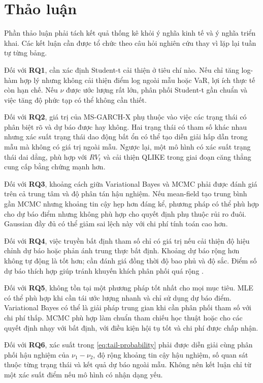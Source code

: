 \documentclass[12pt,a4paper]{article}
\numberwithin{equation}{section}
\newcommand{\RQ}[1]{\textbf{RQ#1}}
\begin{document}
\section{Thảo luận}\label{sec:thao-luan}

Phần thảo luận phải tách kết quả thống kê khỏi ý nghĩa kinh tế và ý nghĩa triển khai. Các kết luận cần được tổ chức theo câu hỏi nghiên cứu thay vì lặp lại tuần tự từng bảng.

Đối với \RQ{1}, cần xác định Student-t cải thiện ở tiêu chí nào. Nếu chỉ tăng log-hàm hợp lý nhưng không cải thiện điểm log ngoài mẫu hoặc VaR, lợi ích thực tế còn hạn chế. Nếu $\nu$ được ước lượng rất lớn, phân phối Student-t gần chuẩn và việc tăng độ phức tạp có thể không cần thiết.

Đối với \RQ{2}, giá trị của MS-GARCH-X phụ thuộc vào việc các trạng thái có phân biệt rõ và dự báo được hay không. Hai trạng thái có tham số khác nhau nhưng xác suất trạng thái dao động bất ổn có thể tạo diễn giải hấp dẫn trong mẫu mà không có giá trị ngoài mẫu. Ngược lại, một mô hình có xác suất trạng thái dai dẳng, phù hợp với $RV_t$ và cải thiện QLIKE trong giai đoạn căng thẳng cung cấp bằng chứng mạnh hơn.

Đối với \RQ{3}, khoảng cách giữa Variational Bayes và MCMC phải được đánh giá trên cả trung tâm và độ phân tán hậu nghiệm. Nếu mean-field tạo trung bình gần MCMC nhưng khoảng tin cậy hẹp hơn đáng kể, phương pháp có thể phù hợp cho dự báo điểm nhưng không phù hợp cho quyết định phụ thuộc rủi ro đuôi. Gaussian đầy đủ có thể giảm sai lệch này với chi phí tính toán cao hơn.

Đối với \RQ{4}, việc truyền bất định tham số chỉ có giá trị nếu cải thiện độ hiệu chỉnh dự báo hoặc phản ánh trung thực bất định. Khoảng dự báo rộng hơn không tự động là tốt hơn; cần đánh giá đồng thời độ bao phủ và độ sắc. Điểm số dự báo thích hợp giúp tránh khuyến khích phân phối quá rộng \cite{gneiting2007}.

Đối với \RQ{5}, không tồn tại một phương pháp tốt nhất cho mọi mục tiêu. MLE có thể phù hợp khi cần tái ước lượng nhanh và chỉ sử dụng dự báo điểm. Variational Bayes có thể là giải pháp trung gian khi cần phân phối tham số với chi phí thấp. MCMC phù hợp làm chuẩn tham chiếu học thuật hoặc cho các quyết định nhạy với bất định, với điều kiện hội tụ tốt và chi phí được chấp nhận.

Đối với \RQ{6}, xác suất trong \cref{eq:tail-probability} phải được diễn giải cùng phân phối hậu nghiệm của $\nu_1-\nu_2$, độ rộng khoảng tin cậy hậu nghiệm, số quan sát thuộc từng trạng thái và kết quả dự báo ngoài mẫu. Không nên kết luận chỉ từ một xác suất điểm nếu mô hình có nhận dạng yếu.
\end{document}
